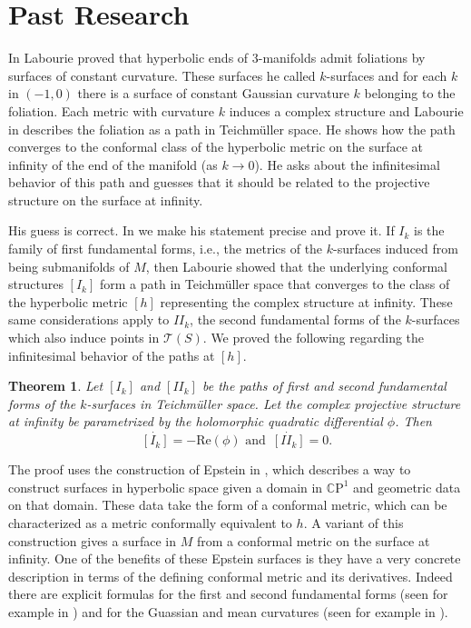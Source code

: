 \documentclass[11pt]{amsart}
\newcommand{\CP}{\mathbb{C}\mathrm{P}}
\newtheorem{thm}{Theorem}[section]
\begin{document}
\section{Past Research}
In \cite{labourie1991} Labourie proved that hyperbolic ends of 3-manifolds admit foliations by surfaces of constant curvature. 
These surfaces he called $k$-surfaces and for each $k$ in $(-1,0)$ there is a surface of constant Gaussian curvature $k$ belonging to the foliation. 
Each metric with curvature $k$ induces a complex structure and Labourie in \cite{labourie1992} describes the foliation as a path in Teichm\"uller space. 
He shows how the path converges to the conformal class of the hyperbolic metric on the surface at infinity of the end of the manifold (as $k \to 0$).
He asks about the infinitesimal behavior of this path and guesses that it should be related to the projective structure on the surface at infinity. 

His guess is correct. 
In \cite{quinn2020} we make his statement precise and prove it. 
If $I_k$ is the family of first fundamental forms, i.e., the metrics of the $k$-surfaces induced from being submanifolds of $M$, then Labourie showed that the underlying conformal structures $[I_k]$ form a path in Teichm\"uller space that converges to the class of the hyperbolic metric $[h]$ representing the complex structure at infinity. 
These same considerations apply to $I\!I_k$, the second fundamental forms of the $k$-surfaces which also induce points in $\mathcal{T}(S)$. 
We proved the following regarding the infinitesimal behavior of the paths at $[h]$.

\begin{thm}
\label{k-surfaces-thm}
Let $[I_k]$ and $[I\!I_k]$ be the paths of first and second fundamental forms of the $k$-surfaces in Teichm\"uller space. 
Let the complex projective structure at infinity be parametrized by the holomorphic quadratic differential $\phi$. 
Then 
\[
\dot{[I_k]} = -\mathrm{Re}(\phi) \text{ and } \, \dot{[I\!I_k]} = 0.
\]
\end{thm}

The proof uses the construction of Epstein in \cite{epstein1984}, which describes a way to construct surfaces in hyperbolic space given a domain in $\CP^1$ and geometric data on that domain. 
These data take the form of a conformal metric, which can be characterized as a metric conformally equivalent to $h$. 
A variant of this construction gives a surface in $M$ from a conformal metric on the surface at infinity. 
One of the benefits of these Epstein surfaces is they have a very concrete description in terms of the defining conformal metric and its derivatives. 
Indeed there are explicit formulas for the first and second fundamental forms (seen for example in \cite{dumas2017}) and for the Guassian and mean curvatures (seen for example in \cite{quinn2020}). 
\end{document}
